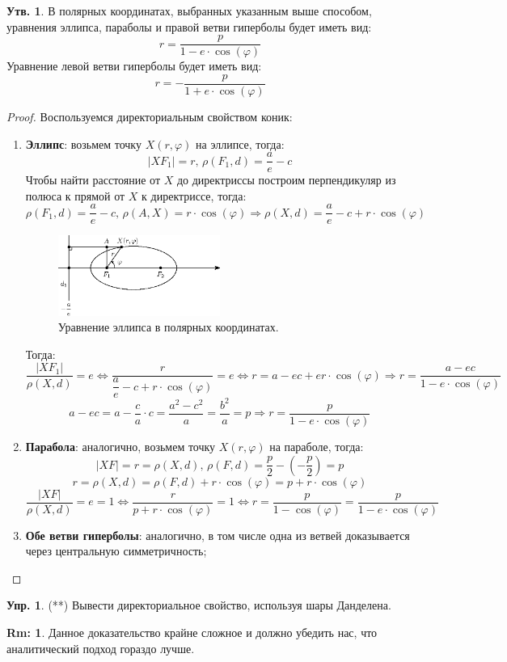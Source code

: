 \documentclass[12pt]{article}
\theoremstyle{definition}
\newtheorem{rem}{Rm:}
\newtheorem{prop}{Утв.}
\newtheorem{exrc}{Упр.}
\begin{document}
\begin{prop}
	В полярных координатах, выбранных указанным выше способом, уравнения эллипса, параболы и правой ветви гиперболы будет иметь вид:
	$$
		r = \dfrac{p}{1 - e{\cdot}\cos{(\varphi)}}
	$$
	Уравнение левой ветви гиперболы будет иметь вид:
	$$
		r = -\dfrac{p}{1 + e{\cdot}\cos{(\varphi)}}
	$$
\end{prop}
\begin{proof}
	Воспользуемся директориальным свойством коник:
	\begin{enumerate}[label=\arabic*)]
		\item \textbf{Эллипс}: возьмем точку $X(r,\varphi)$ на эллипсе, тогда:
		$$
			|XF_1| = r, \, \rho(F_1,d) =\dfrac{a}{e} - c 
		$$
		Чтобы найти расстояние от $X$ до директриссы построим перпендикуляр из полюса к прямой от $X$ к директриссе, тогда:
		$$
			\rho(F_1,d) = \dfrac{a}{e} - c, \, \rho(A,X) = r{\cdot}\cos{(\varphi)} \Rightarrow \rho(X,d) = \dfrac{a}{e} - c + r{\cdot}\cos{(\varphi)}
		$$
		\begin{figure}[H]
			\centering
			\includegraphics[width=0.5\textwidth]{ANGL3_16.eps}
			\caption{Уравнение эллипса в полярных координатах.}
			\label{3_16}
		\end{figure}
		Тогда:
		$$
			\dfrac{|XF_1|}{\rho(X,d)} = e \Leftrightarrow \dfrac{r}{\dfrac{a}{e} - c + r{\cdot}\cos{(\varphi)}} = e \Leftrightarrow r = a - ec + er{\cdot}\cos{(\varphi)} \Rightarrow r = \dfrac{a - ec}{1 - e{\cdot}\cos{(\varphi)}}
		$$
		$$
			a - ec = a - \dfrac{c}{a}{\cdot}c = \dfrac{a^2 - c^2}{a} = \dfrac{b^2}{a} = p \Rightarrow  r = \dfrac{p}{1 - e{\cdot}\cos{(\varphi)}}
		$$
		\item \textbf{Парабола}: аналогично, возьмем точку $X(r,\varphi)$ на параболе, тогда:
		$$
			|XF| = r = \rho(X,d), \, \rho(F,d) = \dfrac{p}{2} - \left(-\dfrac{p}{2}\right) = p
		$$
		$$
			r = \rho(X,d) = \rho(F,d) + r{\cdot}\cos{(\varphi)} = p + r{\cdot}\cos{(\varphi)}
		$$
		$$
			\dfrac{|XF|}{\rho(X,d)} = e = 1 \Leftrightarrow \dfrac{r}{p + r{\cdot}\cos{(\varphi)}} = 1 \Leftrightarrow r = \dfrac{p}{1- \cos{(\varphi)}} = \dfrac{p}{1 - e{\cdot}\cos{(\varphi)}}
		$$
		\item \textbf{Обе ветви гиперболы}: аналогично, в том числе одна из ветвей доказывается через центральную симметричность;
	\end{enumerate}
\end{proof}

\begin{exrc}
	(**) Вывести директориальное свойство, используя шары Данделена.
\end{exrc}
\begin{rem}
	Данное доказательство крайне сложное и должно убедить нас, что аналитический подход гораздо лучше.
\end{rem}
\end{document}
